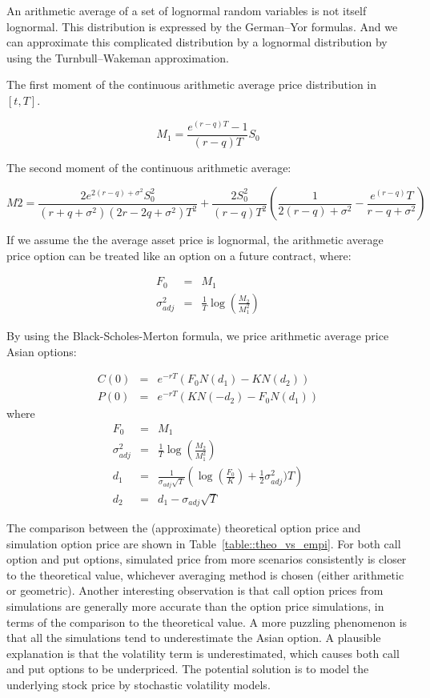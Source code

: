\documentclass[a4paper,11pt] {article}
\begin{document}
An arithmetic average of a set of lognormal random variables is not itself lognormal. This distribution is expressed by the German–Yor formulas. And we can approximate this complicated distribution by a lognormal distribution by using the Turnbull–Wakeman approximation.

The first moment of the continuous arithmetic average price distribution in $[t,T]$.

$$
M_1 = \frac{e^{(r-q)T}-1}{(r-q)T}S_0
$$

The second moment of the continuous arithmetic average:

$$
M2 = \frac{2e^{2(r-q)+\sigma^2}S_0^2}{(r+q+\sigma^2)(2r-2q+\sigma^2)T^2} + \frac{2S_0^2}{(r-q)T^2}\left(\frac{1}{2(r-q)+\sigma^2}-\frac{e^(r-q)T}{r-q+\sigma^2}\right)
$$

If we assume the the average asset price is lognormal, the arithmetic average price option can be treated like an option on a future contract, where:

\begin{eqnarray*}
F_0 &=& M_1 \\
\sigma_{adj}^2 &=& \frac{1}{T} \log(\frac{M_2}{M_1^2})
\end{eqnarray*}

By using the Black-Scholes-Merton formula, we price arithmetic average price Asian options:


\begin{eqnarray*}
C(0) &=& e^{-rT}(F_0 N(d_1)-KN(d_2)) \\
P(0) &=& e^{-rT}(KN(-d_2)-F_0 N(d_1))
\end{eqnarray*}
where
\begin{eqnarray*}
F_0 &=& M_1 \\
\sigma_{adj}^2 &=& \frac{1}{T} \log(\frac{M_2}{M_1^2}) \\
d_1 &=& \frac{1}{\sigma_{adj}\sqrt{T}}\left( \log(\frac{F_0}{K})+ \frac{1}{2}\sigma_{adj}^2)T\right) \\
d_2 &=& d_1 - \sigma_{adj}\sqrt{T}
\end{eqnarray*}

The comparison between the (approximate) theoretical option price and simulation option price are shown in Table~\ref{table::theo_vs_empi}. For both call option and put options, simulated price from more scenarios consistently is closer to the theoretical value, whichever averaging method is chosen (either arithmetic or geometric). Another interesting observation is that call option prices from simulations are generally more accurate than the option price simulations, in terms of the comparison to the theoretical value. A more puzzling phenomenon is that all the simulations tend to underestimate the Asian option. A plausible explanation is that the volatility term is underestimated, which causes both call and put options to be underpriced. The potential solution is to model the underlying stock price by stochastic volatility models.
\end{document}
